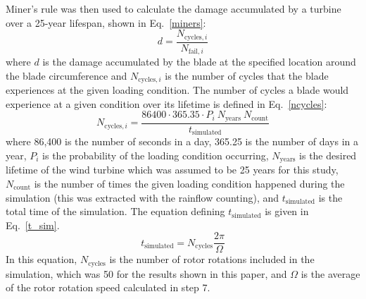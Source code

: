 \documentclass[11pt,letterpaper]{article}
\begin{document}
Miner's rule was then used to calculate the damage accumulated by a turbine over a 25-year lifespan, shown in Eq.~\ref{miners}:
\begin{equation}
    d = \frac{N_{\text{cycles},i}}{N_{\text{fail},i}}
    \label{miners}
\end{equation}
\noindent where $d$ is the damage accumulated by the blade at the specified location around the blade circumference and $N_{\text{cycles},i}$ is the number of cycles that the blade experiences at the given loading condition. 
The number of cycles a blade would experience at a given condition over its lifetime is defined in Eq.~\ref{ncycles}:
% 
\begin{equation}
    N_{\text{cycles},i} = \frac{86400 \cdot 365.35 \cdot P_i ~ N_{\text{years}}~ N_{\text{count}}}{t_{\text{simulated}}}
    \label{ncycles}
\end{equation}
% 
where 86,400 is the number of seconds in a day, 365.25 is the number of days in a year, $P_i$ is the probability of the loading condition occurring, $N_{\text{years}}$ is the desired lifetime of the wind turbine which was assumed to be 25 years for this study, $N_{\text{count}}$ is the number of times the given loading condition happened during the simulation (this was extracted with the rainflow counting), and $t_{\text{simulated}}$ is the total time of the simulation. The equation defining $t_{\text{simulated}}$ is given in Eq.~\ref{t_sim}.
% 
\begin{equation}
    t_{\text{simulated}} = N_{\text{cycles}} \frac{2\pi}{\Omega}
    \label{t_sim}
\end{equation}
% 
In this equation, $N_{\text{cycles}}$ is the number of rotor rotations included in the simulation, which was 50 for the results shown in this paper, and $\Omega$ is the average of the rotor rotation speed calculated in step 7. 

\end{document}
